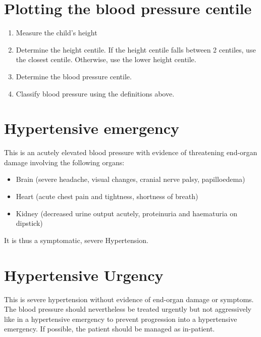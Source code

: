 \documentclass[
  letterpaper,
  DIV=11,
  numbers=noendperiod]{scrreprt}
\providecommand{\tightlist}{%
  \setlength{\itemsep}{0pt}\setlength{\parskip}{0pt}}\usepackage{longtable,booktabs,array}
\begin{document}
\hypertarget{plotting-the-blood-pressure-centile}{%
\section{Plotting the blood pressure
centile}\label{plotting-the-blood-pressure-centile}}

\begin{enumerate}
\def\labelenumi{\arabic{enumi}.}
\tightlist
\item
  Measure the child's height
\item
  Determine the height centile. If the height centile falls between 2
  centiles, use the closest centile. Otherwise, use the lower height
  centile.
\item
  Determine the blood pressure centile.
\item
  Classify blood pressure using the definitions above.
\end{enumerate}

\hypertarget{hypertensive-emergency}{%
\section{Hypertensive emergency}\label{hypertensive-emergency}}

This is an acutely elevated blood pressure with evidence of threatening
end-organ damage involving the following organs:

\begin{itemize}
\tightlist
\item
  Brain (severe headache, visual changes, cranial nerve palsy,
  papilloedema)
\item
  Heart (acute chest pain and tightness, shortness of breath)
\item
  Kidney (decreased urine output acutely, proteinuria and haematuria on
  dipstick)
\end{itemize}

It is thus a symptomatic, severe Hypertension.

\hypertarget{hypertensive-urgency}{%
\section{Hypertensive Urgency}\label{hypertensive-urgency}}

This is severe hypertension without evidence of end-organ damage or
symptoms. The blood pressure should nevertheless be treated urgently but
not aggressively like in a hypertensive emergency to prevent progression
into a hypertensive emergency. If possible, the patient should be
managed as in-patient.
\end{document}
